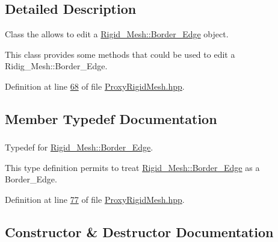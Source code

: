 \subsection{Detailed Description}
Class the allows to edit a \hyperlink{classFVCode3D_1_1Rigid__Mesh_1_1Border__Edge}{Rigid\+\_\+\+Mesh\+::\+Border\+\_\+\+Edge} object. 

This class provides some methods that could be used to edit a Ridig\+\_\+\+Mesh\+::\+Border\+\_\+\+Edge. 

Definition at line \hyperlink{ProxyRigidMesh_8hpp_source_l00068}{68} of file \hyperlink{ProxyRigidMesh_8hpp_source}{Proxy\+Rigid\+Mesh.\+hpp}.



\subsection{Member Typedef Documentation}
\subsubsection[{\texorpdfstring{Border\+\_\+\+Edge}{Border_Edge}}]{}\hypertarget{classFVCode3D_1_1ProxyBorderEdge_a176560e18e23c914702256b4921d9c9c}{}\label{classFVCode3D_1_1ProxyBorderEdge_a176560e18e23c914702256b4921d9c9c}


Typedef for \hyperlink{classFVCode3D_1_1Rigid__Mesh_1_1Border__Edge}{Rigid\+\_\+\+Mesh\+::\+Border\+\_\+\+Edge}. 

This type definition permits to treat \hyperlink{classFVCode3D_1_1Rigid__Mesh_1_1Border__Edge}{Rigid\+\_\+\+Mesh\+::\+Border\+\_\+\+Edge} as a Border\+\_\+\+Edge. 

Definition at line \hyperlink{ProxyRigidMesh_8hpp_source_l00077}{77} of file \hyperlink{ProxyRigidMesh_8hpp_source}{Proxy\+Rigid\+Mesh.\+hpp}.



\subsection{Constructor \& Destructor Documentation}
